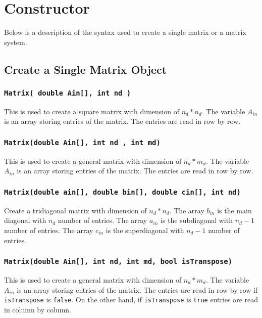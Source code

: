 \documentclass[a4paper]{article}
\begin{document}
\section{Constructor}
Below is a description of the syntax used to create a single matrix or a matrix system.


\subsection{Create a Single Matrix Object}



\subsubsection{\texttt{Matrix( double Ain[], int nd )}}
 
This is used to create a square matrix with dimension of $n_{d}*n_{d}$.
The variable $A_{in}$ is an array storing entries of the matrix. The entries are read in row by row. 

 
\subsubsection{\texttt{Matrix(double Ain[], int nd , int md)}}


This is used to create a general matrix with dimension of $n_{d}*m_{d}$. 
The variable $A_{in}$ is an array storing entries of the matrix. The entries are read in row by row. 

 
\subsubsection{\texttt{Matrix(double ain[], double bin[], double cin[], int nd)}}

Create a tridiagonal matrix with dimension of $n_{d}*n_{d}$.
The array $b_{in}$ is the main diagonal with $n_{d}$ number of entries. The array $a_{in}$ is the subdiagonal with $n_{d}-1$ number of entries. The array $c_{in}$ is the superdiagonal  with $n_{d}-1$ number of entries. 


\subsubsection{\texttt{Matrix(double Ain[], int nd, int md, bool isTranspose)}}


This is used to create a general matrix with dimension of $n_{d}*m_{d}$. The variable $A_{in}$ is an array storing entries of the matrix. The entries are read in row by row if \texttt{isTranspose} is \texttt{false}. On the other hand, if  \texttt{isTranspose} is \texttt{true} entries are read in column by column. 
\end{document}
